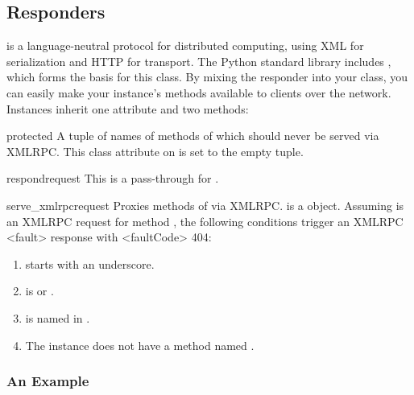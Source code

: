 \subsection{ Responders \label{xmlrpc}}

 is a language-neutral protocol for
distributed computing, using XML for serialization and HTTP for transport. The
Python standard library includes , which forms the
basis for this class. By mixing the  responder into your class,
you can easily make your instance's methods available to clients over the
network. Instances inherit one attribute and two methods:

\begin{memberdesc}[tuple]{protected} A tuple of names of methods of 
which should never be served via XMLRPC. This class attribute on 
is set to the empty tuple.\end{memberdesc}

\begin{methoddesc}{respond}{request}
This is a pass-through for .
\end{methoddesc}

\begin{methoddesc}{serve_xmlrpc}{request}
Proxies methods of  via XMLRPC.  is a 
object. Assuming  is an XMLRPC request for method , the
following conditions trigger an XMLRPC <fault> response with <faultCode> 404:

\begin{enumerate}

\item {} starts with an underscore.

\item {} is  or .

\item {} is named in .

\item The instance does not have a method named .

\end{enumerate}
\end{methoddesc}


\subsubsection{An Example}

